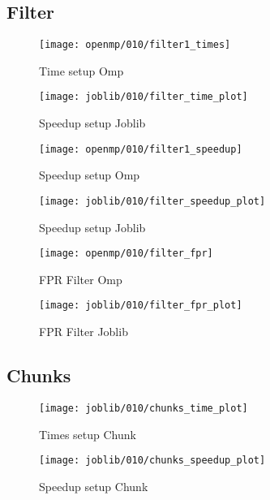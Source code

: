 \subsection{Filter}\label{subsec:fpr-010-filter}
\begin{figure}[H]
    \centering
    \texttt{[image: openmp/010/filter1\_times]}
        \caption{Time setup Omp}\label{fig:010-filter_time_omp}
    \endminipage\hfill
    \texttt{[image: joblib/010/filter\_time\_plot]}
        \caption{Speedup setup Joblib}\label{fig:010-filter_time_joblib}
    \endminipage\hfill
\end{figure}
\begin{figure}[H]
    \centering
    \texttt{[image: openmp/010/filter1\_speedup]}
        \caption{Speedup setup Omp}\label{fig:010-filter_speedup_omp}
    \endminipage\hfill
    \texttt{[image: joblib/010/filter\_speedup\_plot]}
        \caption{Speedup setup Joblib}\label{fig:010-filter_speedup_joblib}
    \endminipage\hfill
\end{figure}
\begin{figure}[H]
    \centering
    \texttt{[image: openmp/010/filter\_fpr]}
        \caption{FPR Filter Omp}\label{fig:010-filter_fpr_omp}
    \endminipage\hfill
    \texttt{[image: joblib/010/filter\_fpr\_plot]}
        \caption{FPR Filter Joblib}\label{fig:010-filter_fpr_joblib}
    \endminipage\hfill
\end{figure}
\subsection{Chunks}\label{subsec:010-chunks}
\begin{figure}[H]
    \centering
    \texttt{[image: joblib/010/chunks\_time\_plot]}
        \caption{Times setup Chunk}\label{fig:010-chunks_time}
    \endminipage\hfill
    \texttt{[image: joblib/010/chunks\_speedup\_plot]}
        \caption{Speedup setup Chunk}\label{fig:010-chunks_speedup}
    \endminipage\hfill
\end{figure}
